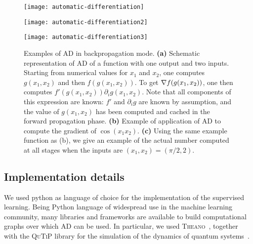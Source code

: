 \begin{figure}[tb]
	\centering
	\begin{minipage}{0.3\linewidth}
		\centering
		\texttt{[image: automatic-differentiation]}
	\end{minipage}\hfill
	\begin{minipage}{0.3\linewidth}
		\centering
		\texttt{[image: automatic-differentiation2]}
	\end{minipage}\hfill
	\begin{minipage}{0.3\linewidth}
		\centering
		\texttt{[image: automatic-differentiation3]}
	\end{minipage}
	\caption{
		Examples of \ac{AD} in backpropagation mode.
		\textbf{(a)}
		Schematic representation of \ac{AD} of a function with one output and two inputs.
		Starting from numerical values for $x_1$ and $x_2$, one computes $g(x_1, x_2)$ and then $f(g(x_1, x_2))$.
		To get $\nabla f(g(x_1, x_2))$, one then computes $f'(g(x_1, x_2))\partial_i g(x_1, x_2)$.
		Note that all components of this expression are known: $f'$ and $\partial_i g$ are known by assumption, and the value of $g(x_1, x_2)$ has been computed and cached in the forward propagation phase.
		\textbf{(b)} Example of application of \ac{AD} to compute the gradient of $\cos(x_1 x_2)$.
		\textbf{(c)} Using the same example function as (b), we give an example of the actual number computed at all stages when the inputs are $(x_1, x_2) = (\pi / 2, 2)$.
	}
	\label{fig:automatic-differentiation}
\end{figure}

\subsection{Implementation details}
\label{subsec:implementation_details}

We used python as language of choice for the implementation of the supervised learning.
Being Python language of widespread use in the machine learning community, many libraries and frameworks are available to build computational graphs over which \ac{AD} can be used.
In particular, we used \textsc{Theano}~\cite{team2016theano}, together with the \textsc{QuTiP} library for the simulation of the dynamics of quantum systems~\cite{johansson2012qutip,johansson2013qutip}.

